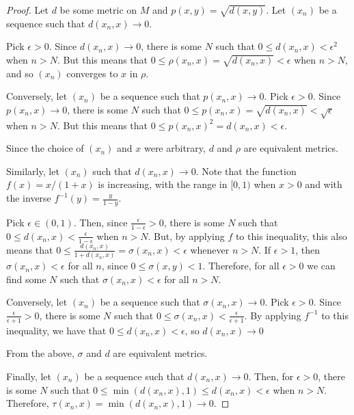 \begin{proof}
Let $d$ be some metric on $M$ and $p(x,y) = \sqrt{d(x,y)}$. Let $(x_n)$ be a sequence such that $d(x_n, x) \rightarrow 0$. 

Pick $\epsilon > 0$. Since $d(x_n, x) \rightarrow 0$, there is some $N$ such that $0 \leq d(x_n, x) < \epsilon^2$ when $n>N$. But this means that $0 \leq \rho(x_n, x) = \sqrt{d(x_n, x)} < \epsilon$ when $n>N$, and so $(x_n)$ converges to $x$ in $\rho$.

Conversely, let $(x_n)$ be a sequence such that $p(x_n, x) \rightarrow 0$. Pick $\epsilon > 0$. Since $p(x_n, x) \rightarrow 0$, there is some $N$ such that $0 \leq p(x_n, x) = \sqrt{d(x_n,x)} < \sqrt{\epsilon}$ when $n>N$. But this means that $0 \leq p(x_n, x)^2 = d(x_n,x) < \epsilon$.

Since the choice of $(x_n)$ and $x$ were arbitrary, $d$ and $\rho$ are equivalent metrics.

\vspace{1em}

Similarly, let $(x_n)$ such that $d(x_n, x) \rightarrow 0$.
Note that the function $f(x) = x/(1+x)$ is increasing, with the range in $[0,1)$ when $x>0$ and with the inverse $f^{-1}(y) = \frac{y}{1-y}$.

Pick $\epsilon \in (0,1)$. Then, since $\frac{\epsilon}{1-\epsilon} > 0$, there is some $N$ such that $0 \leq d(x_n, x) < \frac{\epsilon}{1-\epsilon}$ when $n>N$. But, by applying $f$ to this inequality, this also means that $0 \leq \frac{d(x_n, x)}{1+d(x_n, x)} = \sigma(x_n,x) < \epsilon$ whenever $n>N$.
If $\epsilon > 1$, then $\sigma(x_n, x) < \epsilon$ for all $n$, since $0 \leq \sigma(x,y) < 1$.
Therefore, for all $\epsilon > 0$ we can find some $N$ such that $\sigma(x_n, x) < \epsilon$ for all $n>N$.

Conversely, let $(x_n)$ be a sequence such that $\sigma(x_n,x) \rightarrow 0$. Pick $\epsilon > 0$. Since $\frac{\epsilon}{\epsilon+1} > 0$, there is some $N$ such that $0 \leq \sigma(x_n,x) < \frac{\epsilon}{\epsilon+1}$. By applying $f^{-1}$ to this inequality, we have that $0 \leq d(x_n, x) < \epsilon$, so $d(x_n, x) \rightarrow 0$

From the above, $\sigma$ and $d$ are equivalent metrics.

\vspace{1em}

Finally, let $(x_n)$ be a sequence such that $d(x_n, x) \rightarrow 0$. Then, for $\epsilon > 0$, there is some $N$ such that $0 \leq \min(d(x_n, x), 1) \leq d(x_n, x) < \epsilon$ when $n>N$. Therefore, $\tau(x_n, x) = \min(d(x_n, x), 1) \rightarrow 0$.


\end{proof}
